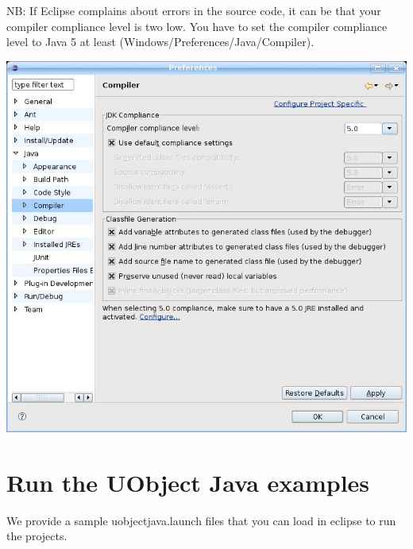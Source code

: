 NB: If Eclipse complains about errors in the source code, it can be that
your compiler compliance level is two low. You have to set the compiler
compliance level to Java 5 at least (Windows/Preferences/Java/Compiler).

\begin{center}
  \includegraphics[width=0.6\linewidth]{img/compiler-compliance-level}
\end{center}


\section{Run the UObject Java examples}
\label{sec:uob:apijava:import}


We provide a sample uobjectjava.launch files that you can load in eclipse to
run the projects.

